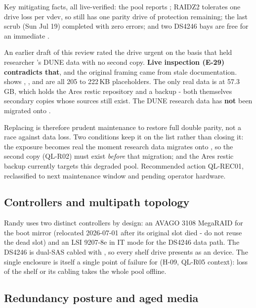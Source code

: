 Key mitigating facts, all live-verified: the pool reports ;
RAIDZ2 tolerates one drive loss per vdev, so  still has one parity drive of
protection remaining; the last scrub (Sun Jul 19) completed with zero errors; and two DS4246
bays are free for an immediate .

\begin{callout}[title={Correction: this is loss of redundancy, not imminent data loss}]
An earlier draft of this review rated the drive urgent on the basis that  held
researcher 's DUNE data with no second copy. \textbf{Live inspection (E-29)
contradicts that}, and the original framing came from stale documentation.  shows , ,  and 
are all 205 to 222\,KB placeholders. The only real data is  at 57.3\,GB,
which holds the Ares restic repository and a  backup - both themselves
secondary copies whose sources still exist. The DUNE research data has \textbf{not} been
migrated onto .

Replacing  is therefore prudent maintenance to restore full double parity, not a
race against data loss. Two conditions keep it on the list rather than closing it: the
exposure becomes real the moment research data migrates onto , so the second copy
(QL-R02) must exist \emph{before} that migration; and the Ares restic backup currently targets
this degraded pool. Recommended action QL-REC01, reclassified to next maintenance window and
pending operator hardware.
\end{callout}

\subsection{Controllers and multipath topology}

Randy uses two distinct controllers by design: an AVAGO 3108 MegaRAID for the boot mirror
(relocated 2026-07-01 after its original slot died - do not reuse the dead slot) and an
LSI 9207-8e in IT mode for the DS4246 data path. The DS4246 is dual-SAS cabled with
, so every shelf drive presents as an  device. The single
enclosure is itself a single point of failure for  (H-09, QL-R05 context):
loss of the shelf or its cabling takes the whole pool offline.

\subsection{Redundancy posture and aged media}

